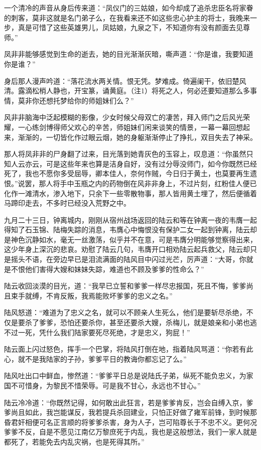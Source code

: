一个清冷的声音从身后传来道：“凤仪门的三姑娘，如今却成了追杀忠臣名将家眷的刺客，莫非这就是名门弟子么，在我看来还不如这些忠心护主的将士，我晚来一步，真是可惜了这些英雄男儿，凤姑娘，九泉之下，不知道你有没有颜面去见尊师。”

凤非非能够感觉到生命的逝去，她的目光渐渐灰暗，嘶声道：“你是谁，我要知道你是谁？”

身后那人漫声吟道：“落花流水两关情。恨无凭。梦难成。倚遍阑干，依旧楚风清。露滴松梢人静也，开宝篆，诵黄庭。（注1）将死之人，何必还要知道那么多事情，莫非你还想托梦给你的师姐妹们么？”

风非非脑海中泛起模糊的影像，少女时候父母双亡的凄苦，拜入师门之后风光荣耀，一心练剑博得师父欢心的辛苦，师姐妹们闲来谈笑的情景，一幕一幕回想起来，渐渐的，一切皆化作过眼云烟，她的身躯渐渐停止了挣扎，双目失去了神采。

那人将凤非非的尸身翻了过来，目光落到她青灰色的玉容上，叹息道：“你虽然只知人云亦云，可是这些年来也算是洁身自好，没有过分辱没师门，如今你既然已经死了，我也不愿你多受屈辱，卿本佳人，奈何作贼，今日归于黄土，也莫要再生遗恨。”说罢，那人将手中玉瓶之内的药物倒在风非非身上，不过片刻，红粉佳人便已化作一滩清水，渗入地下，只余下一些零散物事，那人皆用黄土埋了，然后便循着马蹄印走去，不多时已经没入荒野之中。

九月二十三日，钟离城内，刚刚从宿州战场返回的陆云和等在钟离一夜的韦膺一起得知了石玉锦、陆梅失踪的消息，韦膺心中悔恨没有保护二女一起到钟离，陆云却是神色沉静如水，毫无一丝激荡，似乎并不在意，可是韦膺分明能够觉察得出来，这少年身上深沉的悲哀。劝慰了陆云几句，韦膺开口相劝陆云起兵救父，陆云却只是摇头不语，在旁边早已是泪流满面的陆风目中闪过光芒，厉声道：“大哥，你就是不恨他们害得大嫂和妹妹失踪，难道也不顾及爹爹的性命么？”

陆云收回淡漠的目光，道：“我早已立誓和爹爹一样尽忠报国，死且不悔，爹爹尚且束手就缚，不肯反叛，我焉能败坏爹爹的忠义之名。”

陆风怒道：“难道为了忠义之名，就可以不顾亲人生死么，他们是要斩尽杀绝，不仅是要杀了爹爹，恐怕还要杀你，甚至还要杀大嫂，杀梅儿，就是娘亲和小弟也逃不过一死，凭什么我们陆家要死尽死绝，才是忠义，狗屁！”

陆云面上闪过怒色，挥手一个巴掌，将陆风打倒在地，指着陆风骂道：“你若有此心，就不是我陆家的子孙，爹爹平日的教诲你都忘记了么。”

陆风吐出口中鲜血，惨然道：“爹爹平日总是说陆氏子弟，纵死不能负忠义，为家国不可惜身，为黎民不惜荣辱。可是我不甘心，永远也不甘心。”

陆云冷冷道：“你既然记得，如何敢出此狂言，若是爹爹肯反，岂会自缚入京，爹爹尚且如此，我岂能谋反，我若提兵杀回建业，只怕正好做了雍军前锋，到时候那昏君奸相便可名正言顺的将爹爹杀害，身为人子，岂可陷尊长于不忠不义。更何况爹爹不反，自是不愿见江南亿万黎庶死于内乱，我也是这般想法，我们一家人就是都死了，若能免去内乱灾祸，也是死得其所。”

